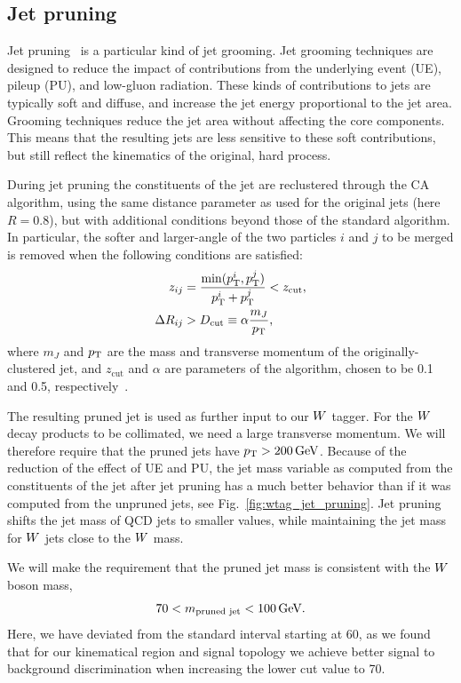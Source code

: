 \subsection{Jet pruning}

Jet pruning~\cite{Ellis:2009su,Ellis:2009me} is a particular kind of jet grooming. Jet grooming
techniques are designed to reduce the impact of contributions from the underlying event (UE), pileup
(PU), and low-\pt gluon radiation. These kinds of contributions to jets are typically soft and
diffuse, and increase the jet energy proportional to the jet area. Grooming techniques reduce the
jet area without affecting the core components. This means that the resulting jets are less
sensitive to these soft contributions, but still reflect the kinematics of the original, hard
process.


During jet pruning the constituents of the jet are reclustered through the CA algorithm, using the
same distance parameter as used for the original jets (here $R=0.8$), but with additional conditions
beyond those of the standard algorithm.
In particular, the softer and larger-angle of the two particles $i$ and $j$ to be merged is removed
when the following conditions are satisfied:
\begin{align}
  z_{ij} &= \frac{\min( p_{\mathrm{T}}^i , p_{\mathrm{T}}^j )}{p_{\mathrm{T}}^i + p_{\mathrm{T}}^j} < z_{\textrm{cut}}, \\
  \Delta R_{ij} &> D_{\textrm{cut}} \equiv \alpha \frac{m_J}{p_{\mathrm{T}}} ,
\end{align}
where $m_J$ and $p_{\mathrm{T}}$ are the mass and transverse momentum of the originally-clustered jet, and
$z_\textrm{cut}$ and $\alpha$ are parameters of the algorithm, chosen to be 0.1 and 0.5,
respectively~\cite{Chatrchyan:2013vbb}. 

The resulting pruned jet is used as further input to our $W$ tagger. For the $W$ decay products
to be collimated, we need a large transverse momentum. We will therefore require that the pruned
jets have $p_{\mathrm{T}} > 200\,\text{Ge\hspace{-.08em}V}$. 
Because of the reduction of the effect of UE and PU, the jet mass variable as computed from the
constituents of the jet after jet pruning has a much better behavior than if it was computed from
the unpruned jets, see Fig.~\ref{fig:wtag_jet_pruning}. Jet pruning shifts the jet mass of QCD jets
to smaller values, while maintaining the jet mass for $W$ jets close to the $W$ mass.

We will make the requirement that the pruned jet mass is consistent with the $W$ boson mass,
\begin{equation}
  70 < m_{\textrm{pruned jet}} < 100 \,\text{Ge\hspace{-.08em}V} .
\end{equation}
Here, we have deviated from the standard interval starting at 60\GeV, as we found that for our
kinematical region and signal topology we achieve better signal to background discrimination when
increasing the lower cut value to 70\GeV. 

